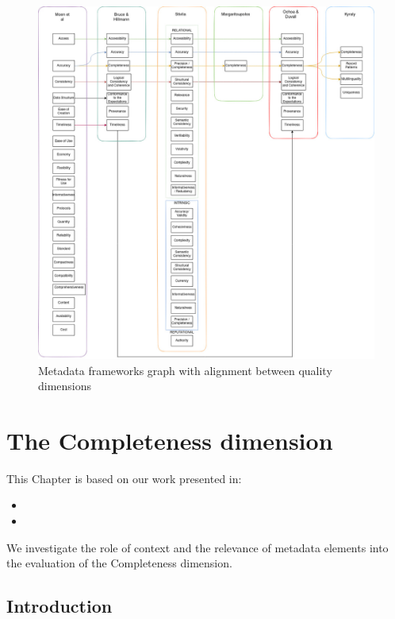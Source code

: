 \documentclass[epsfig,a4paper,12pt,titlepage]{book}
\begin{document}
\begin{figure}[H]
\includegraphics[width=16cm]{frameworks2.jpg}
\caption{Metadata frameworks graph with alignment between quality dimensions}
		\label{img:1}       %
\end{figure}


\chapter{The Completeness dimension}
\label{cha:compl}
\chaptermark{}
This Chapter is based on our work presented in: 
\begin{itemize}
    \item {} 
    \item {}
\end{itemize}

We investigate the role of context and the relevance of metadata elements into the evaluation of the Completeness dimension.
\section{Introduction}
\label{sec:compintro}
\end{document}
